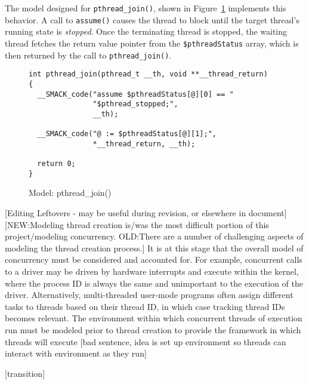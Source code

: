 The model designed for \lstinline|pthread_join()|, shown in
Figure~\ref{fig:pthread_join} implements this behavior.  A call to
\lstinline|assume()| causes the thread to block until the target
thread's running state is \emph{stopped}.  Once the terminating thread
is stopped, the waiting thread fetches the return value pointer from
the \lstinline|$pthreadStatus| array, which is then returned by the
call to \lstinline|pthread_join()|.

\begin{figure}[h]
\centering
\caption{Model: pthread\_join()}\label{fig:pthread_join}
\begin{lstlisting}
int pthread_join(pthread_t __th, void **__thread_return)
{
  __SMACK_code("assume $pthreadStatus[@][0] == "
               "$pthread_stopped;",
               __th);

  __SMACK_code("@ := $pthreadStatus[@][1];",
               *__thread_return, __th);

  return 0;
}

\end{lstlisting}
\end{figure}


[Editing Leftovers - may be useful during revision, or elsewhere in
document] 
[NEW:Modeling thread creation is/was the most difficult portion of
this project/modeling concurrency.  OLD:There are a number of
challenging aspects of modeling the thread creation process.]  It is
at this stage that the overall model of 
concurrency must be considered and accounted for.  For example,
concurrent calls to a driver may be driven by hardware interrupts and
execute within the kernel, where the process ID is always the same and
unimportant to the execution of the driver.  Alternatively,
multi-threaded user-mode programs often assign different tasks to
threads based on their thread ID, in which case tracking thread IDs
becomes relevant.  The environment within which concurrent threads of
execution run must be modeled prior to thread creation to provide the
framework in which threads will execute [bad sentence, idea is set up
environment so threads can interact with environment as they run] 

[transition]


